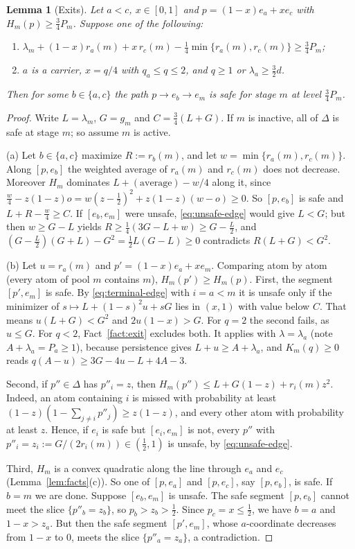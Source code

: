 \documentclass[11pt,a4paper]{article}
\numberwithin{equation}{section}
\newtheorem{lemma}[theorem]{Lemma}
\theoremstyle{definition}
\newcommand{\tq}{\tfrac34}
\begin{document}
\begin{lemma}[Exits]\label{lem:exit}Let $a<c$, $x\in[0,1]$ and $p=(1-x)e_a+xe_c$ with $H_m(p)\ge\frac34P_m$.
Suppose one of the following:
\begin{enumerate}[label=(\alph*)]
\item $\lambda_m+(1-x)r_a(m)+x\,r_c(m)-\frac14\min\{r_a(m),r_c(m)\}\ge\tq P_m$;
\item $a$ is a carrier, $x=q/4$ with $q_a\le q\le2$, and $q\ge1$ or
$\lambda_a\ge\frac32d$.
\end{enumerate}
Then for some $b\in\{a,c\}$ the path $p\to e_b\to e_m$ is safe for stage $m$ at
level $\frac34P_m$.
\end{lemma}

\begin{proof}
Write $L=\lambda_m$, $G=g_m$ and $C=\frac34(L+G)$. If $m$ is inactive, all of
$\Delta$ is safe at stage $m$; so assume $m$ is active.

(a) Let $b\in\{a,c\}$ maximize $R:=r_b(m)$, and let $w=\min\{r_a(m),r_c(m)\}$.
Along $[p,e_b]$ the weighted average of $r_a(m)$ and $r_c(m)$ does not decrease.
Moreover $H_m$ dominates $L+(\text{average})-w/4$ along it, since
$\frac w4-z(1-z)o=w(z-\frac12)^2+z(1-z)(w-o)\ge0$. So $[p,e_b]$ is safe and
$L+R-\frac w4\ge C$. If $[e_b,e_m]$ were unsafe, \eqref{eq:unsafe-edge} would
give $L<G$; but then $w\ge G-L$ yields $R\ge\frac14(3G-L+w)\ge G-\frac L2$, and
$(G-\frac L2)(G+L)-G^2=\frac12L(G-L)\ge0$ contradicts $R(L+G)<G^2$.

(b) Let $u=r_a(m)$ and $p'=(1-x)e_a+xe_m$. Comparing atom by atom (every atom
of pool $m$ contains $m$), $H_m(p')\ge H_m(p)$. First, the segment $[p',e_m]$ is
safe. By \eqref{eq:terminal-edge} with $i=a<m$ it is unsafe only if the minimizer of
$s\mapsto L+(1-s)^2u+sG$ lies in $(x,1)$ with value below $C$. That means
$u(L+G)<G^2$ and $2u(1-x)>G$. For $q=2$ the second fails, as $u\le G$. For
$q<2$, Fact~\ref{fact:exit} excludes both. It applies with $\lambda=\lambda_a$ (note $A+\lambda_a=P_a\ge1$),
because persistence gives $L+u\ge A+\lambda_a$, and $K_m(q)\ge0$ reads
$q(A-u)\ge3G-4u-L+4A-3$.

Second, if $p''\in\Delta$ has $p''_i=z$, then
$H_m(p'')\le L+G(1-z)+r_i(m)z^2$. Indeed, an atom containing $i$ is missed
with probability at least $(1-z)(1-\sum_{j\ne i}p''_j)\ge z(1-z)$, and every
other atom with probability at least $z$. Hence, if $e_i$ is safe but
$[e_i,e_m]$ is not, every $p''$ with $p''_i=z_i:=G/(2r_i(m))\in(\frac12,1)$ is
unsafe, by \eqref{eq:unsafe-edge}.

Third, $H_m$ is a convex quadratic along the line through $e_a$ and $e_c$
(Lemma~\ref{lem:facts}(c)). So one of $[p,e_a]$ and $[p,e_c]$, say $[p,e_b]$,
is safe. If $b=m$ we are done. Suppose $[e_b,e_m]$ is unsafe. The safe segment
$[p,e_b]$ cannot meet the slice $\{p''_b=z_b\}$, so $p_b>z_b>\frac12$. Since
$p_c=x\le\frac12$, we have $b=a$ and $1-x>z_a$. But then the safe segment
$[p',e_m]$, whose $a$-coordinate decreases from $1-x$ to $0$, meets the slice
$\{p''_a=z_a\}$, a contradiction.
\end{proof}
\end{document}
